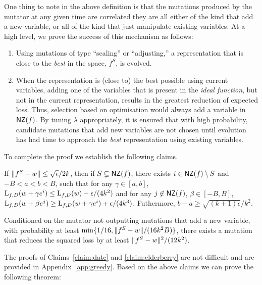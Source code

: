 One thing to note in the above definition is that the mutations produced by the
mutator at any given time are correlated \ie they are all either of the kind
that add a new variable, or all of the kind that just manipulate existing
variables.  At a high level, we prove the success of this mechanism as follows:
\begin{enumerate}
%
\item Using mutations of type ``scaling'' or ``adjusting,'' a representation
that is close to the \emph{best} in the space, \ie $f^S$, is evolved.
%
\item When the representation is (close to) the best possible using current
variables, adding one of the variables that is present in the \emph{ideal
function}, but not in the current representation, results in the greatest
reduction of expected loss. Thus, selection based on optimisation would always
add a variable in $\mathsf{NZ}(f)$. By tuning $\lambda$ appropriately, it is ensured
that with high probability, candidate mutations that add new variables are not
chosen until evolution has had time to approach the \emph{best} representation
using existing variables.
%
\end{enumerate}

To complete the proof we establish the following claims.

\begin{claim} \label{claim:date} If $\Vert f^S - w \Vert \leq
\sqrt{\epsilon}/{2k}$, then if $S \subsetneq \mathsf{NZ}(f)$, there exists $i \in \mathsf{NZ}(f)
\setminus S$ and $-B < a < b < B$, such that for any $\gamma \in [a, b]$,
$\mathrm{L}_{f, D}(w + \gamma e^i) \leq \mathrm{L}_{f, D}(w) - \epsilon/(4k^2)$ and for
any $j \not\in \mathsf{NZ}(f)$, $\beta \in [-B, B]$, $\mathrm{L}_{f, D}(w + \beta e^j) \geq
\mathrm{L}_{f, D}(w + \gamma e^i) + \epsilon/(4k^3)$. Futhermore, $b - a \geq
\sqrt{(k+1) \epsilon}/k^2$. \end{claim}

\begin{claim} \label{claim:elderberry} Conditioned on the mutator not outputting
mutations that add a new variable, with probability at least $\min\{1/16,
\Vert f^S - w \Vert/(16k^2B)\}$, there exists a mutation that reduces the squared
loss by at least $\Vert f^S - w \Vert^2/(12k^2)$. \end{claim}

The proofs of Claims~\ref{claim:date} and \ref{claim:elderberry} are not
difficult and are provided in Appendix~\ref{app:greedy}. Based on the above
claims we can prove the following theorem:

